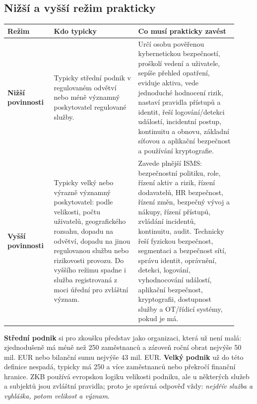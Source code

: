 \subsection*{Nižší a vyšší režim prakticky}
\begin{longtable}{p{0.18\linewidth}p{0.34\linewidth}p{0.40\linewidth}}
\toprule
\textbf{Režim} & \textbf{Kdo typicky} & \textbf{Co musí prakticky zavést}\\
\midrule
\textbf{Nižší povinnosti} &
Typicky střední podnik v regulovaném odvětví nebo méně významný poskytovatel regulované služby. &
Určí osobu pověřenou kybernetickou bezpečností, proškolí vedení a uživatele, sepíše přehled opatření, eviduje aktiva, vede jednoduché hodnocení rizik, nastaví pravidla přístupů a identit, řeší logování/detekci událostí, incidentní postup, kontinuitu a obnovu, základní síťovou a aplikační bezpečnost a používání kryptografie.\\
\addlinespace
\textbf{Vyšší povinnosti} &
Typicky velký nebo výrazně významný poskytovatel: podle velikosti, počtu uživatelů, geografického rozsahu, dopadu na odvětví, dopadu na jinou regulovanou službu nebo rizikovosti provozu. Do vyššího režimu spadne i služba registrovaná z moci úřední pro zvláštní význam. &
Zavede plnější ISMS: bezpečnostní politiku, role, řízení aktiv a rizik, řízení dodavatelů, HR bezpečnost, řízení změn, bezpečný vývoj a nákupy, řízení přístupů, zvládání incidentů, kontinuitu, audit. Technicky řeší fyzickou bezpečnost, segmentaci a bezpečnost sítí, správu identit, oprávnění, detekci, logování, vyhodnocování událostí, aplikační bezpečnost, kryptografii, dostupnost služby a OT/řídicí systémy, pokud je má.\\
\bottomrule
\end{longtable}

\textbf{Střední podnik} si pro zkoušku představ jako organizaci, která už není malá: zjednodušeně má méně než 250 zaměstnanců a zároveň roční obrat nejvýše 50 mil. EUR nebo bilanční sumu nejvýše 43 mil. EUR. \textbf{Velký podnik} už do této definice nespadá, typicky má 250 a více zaměstnanců nebo překročí finanční hranice. ZKB používá evropskou logiku velikosti podniku, ale u některých služeb a subjektů jsou zvláštní pravidla; proto je správná odpověď vždy: \emph{nejdřív služba a vyhláška, potom velikost a význam}.

